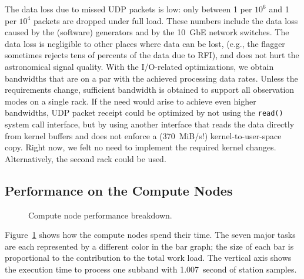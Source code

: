 \documentclass{sig-alternate}
\begin{document}
The data loss due to missed UDP packets is low: only between 1 per $10^6$ and
1 per $10^4$ packets are dropped under full load.
These numbers include the data loss caused by the (software) generators and by
the 10~GbE network switches.
The data loss is negligible to other places where data can be lost,
(e.g., the flagger sometimes rejects tens of percents of the data due to RFI),
and does not hurt the astronomical signal quality.
With the I/O-related optimizations, we obtain bandwidths that are on a par
with the achieved processing data rates.
Unless the requirements change, sufficient bandwidth is obtained to support
all observation modes on a single rack.
If the need would arise to achieve even higher bandwidths, UDP packet receipt
could be optimized by not using the \texttt{read()} system call interface,
but by using another interface that reads the data directly from kernel buffers
and does not enforce a (370~MiB/s!) kernel-to-user-space copy.
Right now, we felt no need to implement the required kernel changes.
Alternatively, the second rack could be used.


\subsection{Performance on the Compute Nodes}

\begin{figure}[ht]
\hfill
\caption{Compute node performance breakdown.}
\label{fig:cn-performance}
\end{figure}

Figure~\ref{fig:cn-performance} shows how the compute nodes spend their time.
The seven major tasks are each represented by a different color in the bar
graph; the size of each bar is proportional to the contribution to the total
work load.
The vertical axis shows the execution time to process one subband with
1.007~second of station samples.
\end{document}
